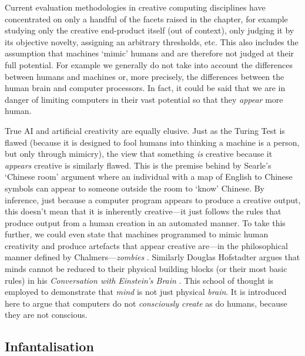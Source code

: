 Current evaluation methodologies in creative computing disciplines have concentrated on only a handful of the facets raised in the  chapter, for example studying only the creative end-product itself (out of context), only judging it by its objective novelty, assigning an arbitrary thresholds, etc. This also includes the assumption that machines `mimic' humans and are therefore not judged at their full potential. For example we generally do not take into account the differences between humans and machines or, more precisely, the differences between the human brain and computer processors. In fact, it could be said that we are in danger of limiting computers in their vast potential so that they \emph{appear} more human.

True \ac{AI} and artificial creativity are equally elusive. Just as the Turing Test \autocite{Turing1950} is flawed (because it is designed to fool humans into thinking a machine is a person, but only through mimicry), the view that something \emph{is} creative because it \emph{appears} creative is similarly flawed. This is the premise behind by Searle's `Chinese room' argument \autocite*{Searle1980} where an individual with a map of English to Chinese symbols can appear to someone outside the room to `know' Chinese. By inference, just because a computer program appears to produce a creative output, this doesn't mean that it is inherently creative---it just follows the rules that produce output from a human creation in an automated manner. To take this further, we could even state that machines programmed to mimic human creativity and produce artefacts that appear creative are---in the philosophical manner defined by Chalmers---\emph{zombies} \autocite*{Chalmers1996}. Similarly Douglas Hofstadter argues that minds cannot be reduced to their physical building blocks (or their most basic rules) in his \textit{Conversation with Einstein's Brain} \autocite*{Hofstadter1981}. This school of thought is employed to demonstrate that \emph{mind} is not just physical \emph{brain}. It is introduced here to argue that computers do not \emph{consciously create} as do humans, because they are not conscious.


\subsection{Infantalisation}
\label{s:babying}

